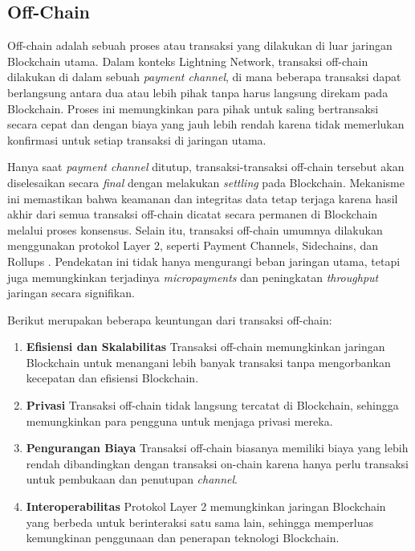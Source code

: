 \subsection{Off-Chain}
\label{subsec:offchain}

Off-chain adalah sebuah proses atau transaksi yang dilakukan di luar jaringan Blockchain utama. Dalam konteks Lightning Network, transaksi off-chain dilakukan di dalam sebuah \textit{payment channel}, di mana beberapa transaksi dapat berlangsung antara dua atau lebih pihak tanpa harus langsung direkam pada Blockchain. Proses ini memungkinkan para pihak untuk saling bertransaksi secara cepat dan dengan biaya yang jauh lebih rendah karena tidak memerlukan konfirmasi untuk setiap transaksi di jaringan utama.

Hanya saat \textit{payment channel} ditutup, transaksi-transaksi off-chain tersebut akan diselesaikan secara \textit{final} dengan melakukan \textit{settling} pada Blockchain. Mekanisme ini memastikan bahwa keamanan dan integritas data tetap terjaga karena hasil akhir dari semua transaksi off-chain dicatat secara permanen di Blockchain melalui proses konsensus. Selain itu, transaksi off-chain umumnya dilakukan menggunakan protokol Layer 2, seperti Payment Channels, Sidechains, dan Rollups \parencite{sguanci2021layer}. Pendekatan ini tidak hanya mengurangi beban jaringan utama, tetapi juga memungkinkan terjadinya \textit{micropayments} dan peningkatan \textit{throughput} jaringan secara signifikan.

Berikut merupakan beberapa keuntungan dari transaksi off-chain:

\begin{enumerate}
  \item \textbf{Efisiensi dan Skalabilitas} \newline
  Transaksi off-chain memungkinkan jaringan Blockchain untuk menangani lebih banyak transaksi tanpa mengorbankan kecepatan dan efisiensi Blockchain.
  \item \textbf{Privasi} \newline
  Transaksi off-chain tidak langsung tercatat di Blockchain, sehingga memungkinkan para pengguna untuk menjaga privasi mereka.
  \item \textbf{Pengurangan Biaya} \newline
  Transaksi off-chain biasanya memiliki biaya yang lebih rendah dibandingkan dengan transaksi on-chain karena hanya perlu transaksi untuk pembukaan dan penutupan \textit{channel}.
  \item \textbf{Interoperabilitas} \newline
  Protokol Layer 2 memungkinkan jaringan Blockchain yang berbeda untuk berinteraksi satu sama lain, sehingga memperluas kemungkinan penggunaan dan penerapan teknologi Blockchain.
\end{enumerate}
